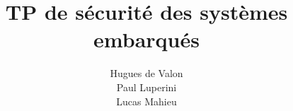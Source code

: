 \documentclass[A4]{article}
\title{TP de sécurité des systèmes embarqués}
\author{Hugues de Valon\\ Paul Luperini\\ Lucas Mahieu}
\begin{document}
\maketitle
   
   
\pagebreak
\tableofcontents

\pagebreak

\end{document}
